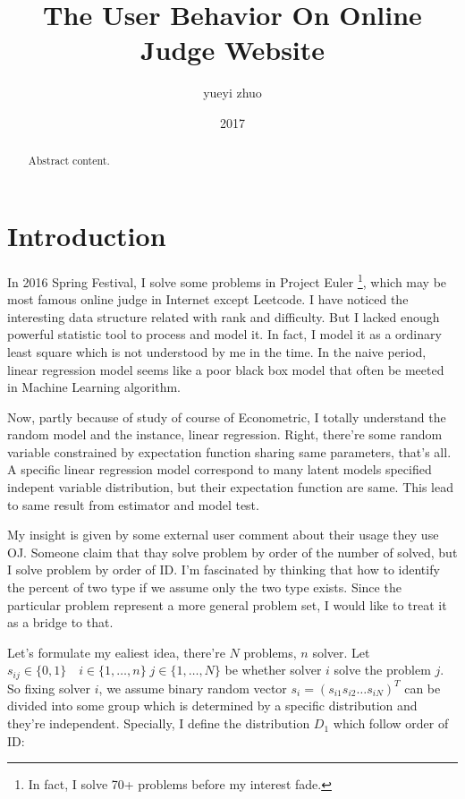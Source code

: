 \documentclass{article}
\title{The User Behavior On Online Judge Website}
\author{yueyi zhuo}
\date{2017}
\begin{document}
\maketitle

\begin{abstract}

Abstract content.

\end{abstract}

\section{Introduction}

In 2016 Spring Festival, I solve some problems in Project Euler 
\footnote{In fact, I solve 70+ problems before my interest fade.}, 
which may be most famous online judge 
in Internet except Leetcode. I have noticed the interesting data structure related with rank and difficulty.
But I lacked enough powerful statistic tool to process and model it. 
In fact, I model it as a ordinary least square which is not understood by me in the time. In the naive period,
linear regression model seems like a poor black box model that often be meeted in Machine Learning algorithm.

Now, partly because of study of course of Econometric, I totally understand the random model and the instance,
linear regression. 
Right, there're some random variable constrained by expectation function sharing same parameters, that's all.
A specific linear regression model correspond to many latent models specified indepent variable distribution,
but their expectation function are same. This lead to same result from estimator and model test.

My insight is given by some external user comment about their usage they use OJ. 
Someone claim that thay solve problem by order of the number of solved, but I solve problem by order of ID.
I'm fascinated by thinking that how to identify the percent of two type if we assume only the two type exists.
Since the particular problem represent a more general problem set, I would like to treat it as a bridge to that.

Let's formulate my ealiest idea, there're $N$ problems, $n$ solver. Let 
$s_{ij} \in \{ 0,1 \} \quad i \in \{ 1,\dots,n \} \; j \in \{ 1,\dots,N \}$ be whether solver $i$ solve the problem $j$.
So fixing solver $i$, we assume binary random vector $s_i = ( s_{i1} s_{i2} \dots s_{iN} )^T$ 
can be divided into some group which is determined by a specific distribution and they're independent.
Specially, I define the distribution $D_1$ which follow order of ID:
\end{document}
